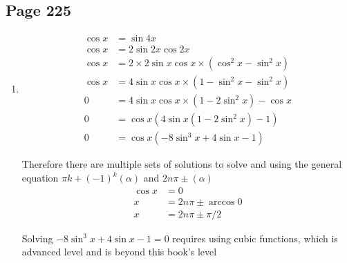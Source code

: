 \documentclass{article}
\newenvironment{solutions}[1]
{\subsection*{#1}
 \begin{enumerate}[leftmargin=1.5em]}
{\end{enumerate}}
\newcommand{\solution}{\item}
\begin{document}
\begin{solutions}{Page 225}
Therefore there are multiple sets of solutions to solve and using the general equation $\pi k + (-1)^k (\alpha)$
\begin{align*}
    \sin x &= 0\\
    x &= \pi k + (-1)^k (\arcsin 0)\\
    x &= \pi k
\end{align*}

The other sets of solutions are 
\begin{align*}
    2\sin^2 x -1 &= 0\\
    \sin^2 x &= 1/2\\
    \sin x &= \pm 1/\sqrt{2}\\
    \text{For } \sin x &= 1/\sqrt{2}\\
    x  &= \pi k + (-1)^k (\arcsin 1/\sqrt{2})\\
    x &= \pi k + (-1)^k \times \pi/4\\
    \text{For } \sin x &= -1/\sqrt{2}\\
    x  &= \pi k + (-1)^k (\arcsin -1/\sqrt{2})\\
    x &= \pi k + (-1)^k \times -\pi/4\\
\end{align*}

Note: I think the questions is supposed to be $\sin x = \sin^3 x$?
\solution
\begin{align*}
    \cos x &= \sin 4x\\
    \cos x &= 2\sin 2x \cos 2x\\
    \cos x &= 2 \times 2\sin x \cos x \times (\cos^2 x - \sin^2 x)\\
    \cos x &= 4\sin x \cos x \times (1- \sin^2 x - \sin^2 x)\\
    0 &= 4\sin x \cos x \times (1- 2\sin^2 x) - \cos x\\
    0 &= \cos x \left(4\sin x (1- 2\sin^2 x) - 1\right)\\
    0 &= \cos x \left(-8 \sin ^3 x + 4\sin x - 1\right)
\end{align*}

Therefore there are multiple sets of solutions to solve and using the general equation $\pi k + (-1)^k (\alpha)$ and $2n\pi \pm (\alpha)$
\begin{align*}
    \cos x &= 0\\
    x &= 2n\pi \pm \arccos 0\\
    x &= 2n\pi \pm \pi/2
\end{align*}

Solving $-8\sin^3 x+ 4\sin x -1=0$ requires using cubic functions, which is advanced level and is beyond this book's level


\end{solutions}
\end{document}
